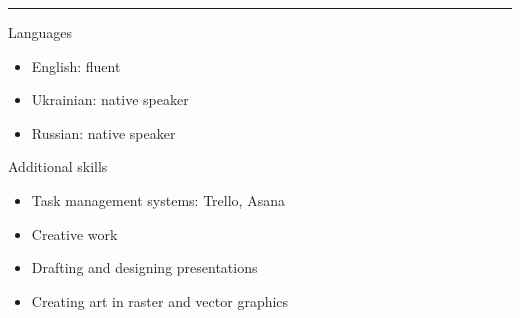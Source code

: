 \documentclass[a4paper,10pt]{article}
\newlength{\cvcolumngapwidth}
\newlength{\cvleftcolumnwidth}
\newlength{\cvrightcolumnwidth}
\newcommand{\cvsectionstyle}[1]{{\normalsize\cvsectionfont\textcolor{cvsectioncolor}{#1}}}
\newcommand{\cvheadingstyle}[1]{{\normalsize\cvheadingfont\textcolor{cvheadingcolor}{#1}}}
\newlength{\cvafteritemskipamount}
\newlength{\cvaftersectionskipamount}
\newlength{\cvbetweensectionandheadingextraskipamount}
\newlength{\cvparskip}
\newcommand{\cvsection}[1]{
\begin{minipage}[t]{\cvleftcolumnwidth}
    \raggedleft\cvsectionstyle{#1}
\end{minipage}%
\hspace{\cvcolumngapwidth}%
\begin{minipage}[t]{\cvrightcolumnwidth}
    \textcolor{cvrulecolor}{\rule{\cvrightcolumnwidth}{0.3mm}}
\end{minipage}

\vspace{\cvaftersectionskipamount}
}
\newcommand{\cvitem}[2]{
\begin{minipage}[t]{\cvleftcolumnwidth}
    \raggedleft #1
\end{minipage}%
\hspace{\cvcolumngapwidth}%
\begin{minipage}[t]{\cvrightcolumnwidth}
    \setlength{\parskip}{\cvparskip} #2
\end{minipage}

\vspace{\cvafteritemskipamount}
}
\begin{document}

\cvsection{SKILLS}

\vspace{\cvbetweensectionandheadingextraskipamount}

\cvitem{
\cvheadingstyle{Languages}
}{
    \begin{itemize}
        \item \cvsectionstyle{English}: fluent 
        \item \cvsectionstyle{Ukrainian}: native speaker
        \item \cvsectionstyle{Russian}: native speaker
    \end{itemize}
}

\cvitem{
\cvheadingstyle{Additional skills}
}{
    \begin{itemize}
        \item Task management systems: Trello, Asana
        
        \item Creative work
        
        \item Drafting and designing presentations
        
        \item Creating art in raster and vector graphics
    \end{itemize}

}










\end{document}
